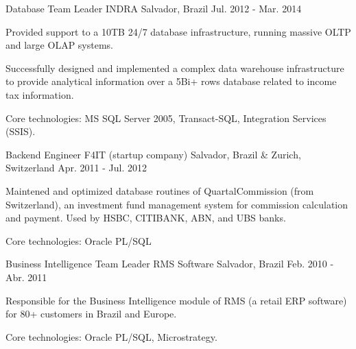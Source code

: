 \begin{cventries}

\cventry
{Database Team Leader} %
{INDRA} %
{Salvador, Brazil} %
{Jul. 2012 - Mar. 2014} %
{ %
\begin{cvitems}
	\item{Provided support to a 10TB 24/7 database infrastructure, running massive OLTP and large OLAP systems.}
	\item{Successfully designed and implemented a complex data warehouse infrastructure to provide analytical information over a 5Bi+ rows database related to income tax information.}
	\item{Core technologies: MS SQL Server 2005, Transact-SQL, Integration Services (SSIS).}
\end{cvitems} 
}


\cventry
{Backend Engineer} %
{F4IT (startup company)} %
{Salvador, Brazil \& Zurich, Switzerland} %
{Apr. 2011 - Jul. 2012} %
{ %
\begin{cvitems}
	\item{Maintened and optimized database routines of QuartalCommission (from Switzerland), an investment fund management system for commission calculation and payment. Used by HSBC, CITIBANK, ABN, and UBS banks.}
	\item{Core technologies: Oracle PL/SQL}
\end{cvitems}
}


\cventry
{Business Intelligence Team Leader} %
{RMS Software} %
{Salvador, Brazil} %
{Feb. 2010 - Abr. 2011} %
{ %
\begin{cvitems}
	\item{Responsible for the Business Intelligence module of RMS (a retail ERP software) for 80+ customers in Brazil and Europe.}
	\item{Core technologies: Oracle PL/SQL, Microstrategy.}
\end{cvitems}
}



\end{cventries}
